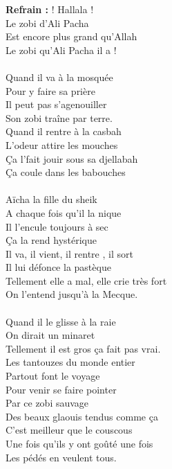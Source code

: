 
\textbf{Refrain :}
 ! Hallala ! \bissimple
\\Le zobi d'Ali Pacha
\\Est encore plus grand qu'Allah
\\Le zobi qu'Ali Pacha il a !
\\\\Quand il va à la mosquée
\\Pour y faire sa prière
\\Il peut pas s'agenouiller
\\Son zobi traîne par terre.
\\Quand il rentre à la casbah
\\L'odeur attire les mouches
\\Ça l'fait jouir sous sa djellabah
\\Ça coule dans les babouches
\\\\Aïcha la fille du sheik
\\A chaque fois qu'il la nique
\\Il l'encule toujours à sec
\\Ça la rend hystérique
\\Il va, il vient, il rentre , il sort
\\Il lui défonce la pastèque
\\Tellement elle a mal, elle crie très fort
\\On l'entend jusqu'à la Mecque.
\\\\Quand il le glisse à la raie
\\On dirait un minaret
\\Tellement il est gros ça fait pas vrai.
\\Les tantouzes du monde entier
\\Partout font le voyage
\\Pour venir se faire pointer
\\Par ce zobi sauvage
\\Des beaux glaouis tendus comme ça
\\C'est meilleur que le couscous
\\Une fois qu'ils y ont goûté une fois
\\Les pédés en veulent tous.

\breakpage